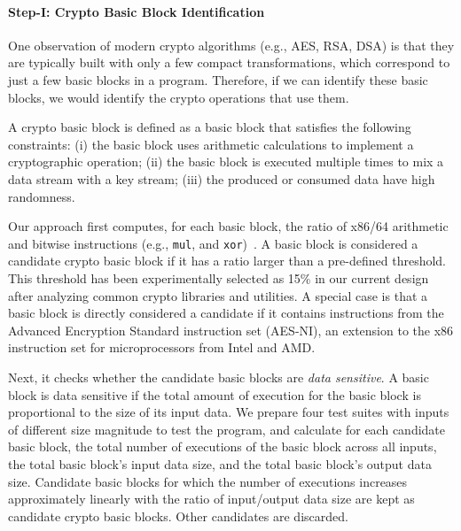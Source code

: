 \paragraph{Step-I: Crypto {Basic Block} Identification} %
One observation of modern crypto algorithms (e.g., \textsf{\small AES}, \textsf{\small RSA},  \textsf{\small DSA}) is that they are typically built with only a few compact transformations, which correspond to just a few basic blocks in a program. 
Therefore, if we can identify these basic blocks, we would  identify the crypto operations that use them. 

\begin{Definition}
\label{def:cryptoblock}
A crypto basic block is defined as a basic block that satisfies the following constraints: 
(i) the basic block uses arithmetic calculations to implement a cryptographic  operation; 
(ii) the basic block is executed multiple times to mix a data stream with a key stream; 
(iii) the produced or consumed data have high randomness.
\end{Definition}

Our approach first computes, for each basic block, the ratio of  x86/64 arithmetic and bitwise instructions (e.g., \texttt{mul}, and \texttt{xor})~\cite{caballero2009dispatcher, intelx86}. 
A basic block is considered a candidate crypto basic block if it has a ratio larger than a pre-defined threshold. 
This threshold has been experimentally selected as 15\% in our current design after analyzing common crypto libraries and utilities.
A special case is that a basic block is directly considered a candidate if it contains instructions from the Advanced Encryption Standard instruction set (AES-NI),  an extension to the x86 instruction set for microprocessors from Intel and AMD.

Next, it checks whether the candidate basic blocks are \emph{data sensitive}. 
A basic block is data sensitive if the total amount of execution for the basic block is proportional to the size of its input data. 
We prepare four test suites with inputs of different size magnitude to test the program, and calculate for each candidate basic block, 
the total number of executions of the basic block across all inputs, the total basic block's input data size, and the total basic block's output data size. 
Candidate basic blocks for which the number of executions increases approximately linearly with the ratio of input/output data size are kept as candidate crypto basic blocks. Other candidates are discarded.
 
